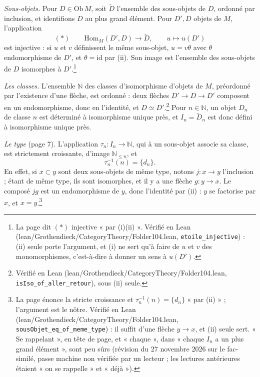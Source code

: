 \documentclass[11pt,a4paper]{article}
\begin{document}
\emph{Sous-objets.} Pour $D \in \mathrm{Ob}\, M$, soit $\widetilde{D}$
l'ensemble des sous-objets de $D$, ordonné par inclusion, et identifions $D$ au
plus grand élément. Pour $D', D$ objets de $M$, l'application
\[
(*) \qquad \mathrm{Hom}_{M}(D', D) \longrightarrow \widetilde{D},
\qquad u \longmapsto u(D')
\]
est injective : si $u$ et $v$ définissent le même sous-objet, $u = v\theta$
avec $\theta$ endomorphisme de $D'$, et $\theta = \mathrm{id}$ par (ii). Son
image est l'ensemble des sous-objets de $D$ isomorphes à $D'$.\footnote{La page
dit $(*)$ injective « par (i)(ii) ». Vérifié en Lean
(lean/Grothendieck/CategoryTheory/Folder104.lean, \texttt{etoile\_injective}) : (ii) seule
porte l'argument, et (i) ne sert qu'à faire de $u$ et $v$ des monomorphismes,
c'est-à-dire à donner un sens à $u(D')$.}

\emph{Les classes.} L'ensemble $\mathbb{N}$ des classes d'isomorphisme
d'objets de $M$, préordonné par l'existence d'une flèche, est ordonné : deux
flèches $D' \to D \to D'$ composent en un endomorphisme, donc en
l'identité, et $D \simeq D'$.\footnote{Vérifié en Lean
(lean/Grothendieck/CategoryTheory/Folder104.lean, \texttt{isIso\_of\_aller\_retour}), sous
(ii) seule.} Pour $n \in \mathbb{N}$, un objet $D_{n}$ de
classe $n$ est déterminé à isomorphisme unique près, et $I_{n} =
\widetilde{D}_{n}$ est donc défini à isomorphisme unique près.

\emph{Le type} (page 7). L'application $\tau_{n} : I_{n} \to \mathbb{N}$, qui
à un sous-objet associe sa classe, est strictement croissante, d'image
$\mathbb{N}_{\leq n}$, et
\[
\tau_{n}^{-1}(n) = \{d_{n}\}.
\]
En effet, si $x \subset y$ sont deux sous-objets de même type, notons
$j : x \to y$ l'inclusion ; étant de même type, ils sont isomorphes, et il y a
une flèche $g : y \to x$. Le composé $j g$ est un endomorphisme de $y$, donc
l'identité par (ii) : $y$ se factorise par $x$, et $x = y$.\footnote{La page
énonce la stricte croissance et $\tau_{n}^{-1}(n) = \{d_{n}\}$ « par (ii) » ;
l'argument est le nôtre. Vérifié en Lean (lean/Grothendieck/CategoryTheory/Folder104.lean,
\texttt{sousObjet\_eq\_of\_meme\_type}) : il suffit d'une flèche $y \to x$, et
(ii) seule sert. « Se rappelant », en tête de page, et « chaque », dans
« chaque $I_{n}$ a un plus grand élément », sont peu sûrs (révision du 27
novembre 2026 sur le fac-similé, passe machine non vérifiée par un lecteur ;
les lectures antérieures étaient « on se rappelle » et « déjà »).}
\end{document}
